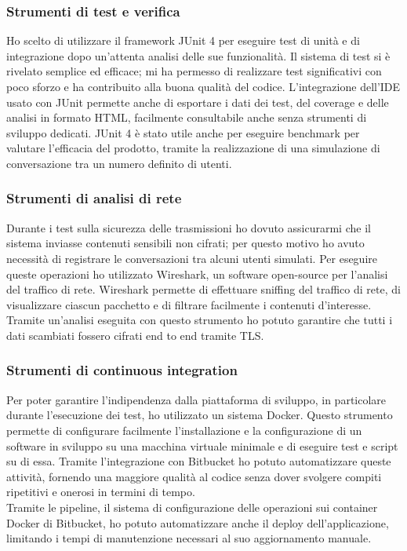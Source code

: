 		\subsubsection{Strumenti di test e verifica}
		Ho scelto di utilizzare il framework JUnit 4 per eseguire test di unità e di integrazione dopo un'attenta analisi delle sue funzionalità. Il sistema di test si è rivelato semplice ed efficace; mi ha permesso di realizzare test significativi con poco sforzo e ha contribuito alla buona qualità del codice. L'integrazione dell'IDE usato con JUnit permette anche di esportare i dati dei test, del coverage e delle analisi in formato HTML, facilmente consultabile anche senza strumenti di sviluppo dedicati. JUnit 4 è stato utile anche per eseguire benchmark per valutare l'efficacia del prodotto, tramite la realizzazione di una simulazione di conversazione tra un numero definito di utenti.
		
		\subsubsection{Strumenti di analisi di rete}
		Durante i test sulla sicurezza delle trasmissioni ho dovuto assicurarmi che il sistema inviasse contenuti sensibili non cifrati; per questo motivo ho avuto necessità di registrare le conversazioni tra alcuni utenti simulati. Per eseguire queste operazioni ho utilizzato Wireshark, un software open-source per l'analisi del traffico di rete. Wireshark permette di effettuare sniffing del traffico di rete, di visualizzare ciascun pacchetto e di filtrare facilmente i contenuti d'interesse. Tramite un'analisi eseguita con questo strumento ho potuto garantire che tutti i dati scambiati fossero cifrati end to end tramite TLS.\@
		
		\subsubsection{Strumenti di continuous integration}
		Per poter garantire l'indipendenza dalla piattaforma di sviluppo, in particolare durante l'esecuzione dei test, ho utilizzato un sistema \gls{Docker}. Questo strumento permette di configurare facilmente l'installazione e la configurazione di un software in sviluppo su una macchina virtuale minimale e di eseguire test e script su di essa. Tramite l'integrazione con Bitbucket ho potuto automatizzare queste attività, fornendo una maggiore qualità al codice senza dover svolgere compiti ripetitivi e onerosi in termini di tempo.
		\\
		Tramite le pipeline, il sistema di configurazione delle operazioni sui container \gls{Docker} di Bitbucket, ho potuto automatizzare anche il deploy dell'applicazione, limitando i tempi di manutenzione necessari al suo aggiornamento manuale.

